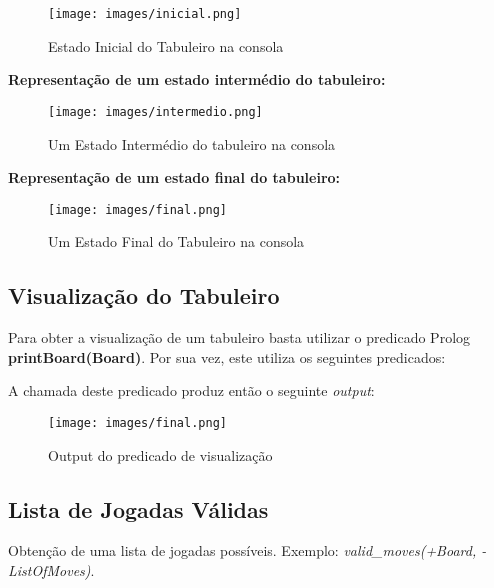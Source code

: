 \documentclass[a4paper]{article}
\begin{document}
\begin{figure}[H]
	\centering
	\texttt{[image: images/inicial.png]}
	\caption{Estado Inicial do Tabuleiro na consola}
	\label{fig:estado_inicial}
\end{figure}
\newpage
\textbf{Representação de um estado intermédio do tabuleiro:}
\linebreak


\begin{figure}[H]
	\centering
	\texttt{[image: images/intermedio.png]}
	\caption{Um Estado Intermédio do tabuleiro na consola}
	\label{fig:estado_intermedio}
\end{figure}
\newpage
\textbf{Representação de um estado final do tabuleiro:}
\linebreak


\begin{figure}[H]
	\centering
	\texttt{[image: images/final.png]}
	\caption{Um Estado Final do Tabuleiro na consola}
	\label{fig:estado_final}
\end{figure}

\newpage

\subsection{Visualização do Tabuleiro} 

Para obter a visualização de um tabuleiro basta utilizar o predicado Prolog  \textbf{printBoard(Board)}. Por sua vez, este utiliza os seguintes predicados: 


A chamada deste predicado produz então o seguinte  \textit{output}:
\begin{figure}[H]
    \centering
    \texttt{[image: images/final.png]}
    \caption{Output do predicado de visualização}
    \label{fig:final_board}
\end{figure}

\subsection{Lista de Jogadas Válidas} Obtenção de uma lista de jogadas possíveis. Exemplo: \textit{valid\_moves(+Board, -ListOfMoves)}.
\end{document}
